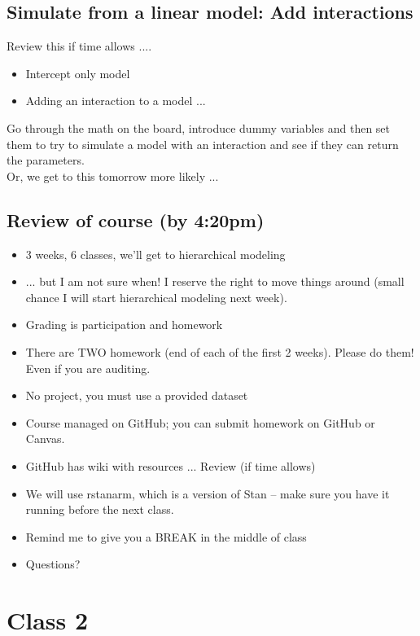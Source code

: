 \documentclass[11pt]{article}
\begin{document}
\subsection{Simulate from a linear model: Add interactions}

Review this if time allows .... 
\begin{itemize}
\item Intercept only model
\item Adding an interaction to a model ... 
\end{itemize}

Go through the math on the board, introduce dummy variables and then set them to try to simulate a model with an interaction and see if they can return the parameters. \\
Or, we get to this tomorrow more likely ... 

\subsection{Review of course (by 4:20pm)}
\begin{itemize}
\item 3 weeks, 6 classes, we'll get to hierarchical modeling
\item ... but I am not sure when! I reserve the right to move things around (small chance I will start hierarchical modeling next week). 
\item Grading is participation and homework
\item There are TWO homework (end of each of the first 2 weeks). Please do them! Even if you are auditing.
\item No project, you must use a provided dataset
\item Course managed on GitHub; you can submit homework on GitHub or Canvas. 
\item GitHub has wiki with resources ... Review (if time allows)
\item We will use rstanarm, which is a version of Stan -- make sure you have it running before the next class. 
\item Remind me to give you a BREAK in the middle of class
\item Questions?
\end{itemize}

\newpage
\section{Class 2} 
\end{document}

